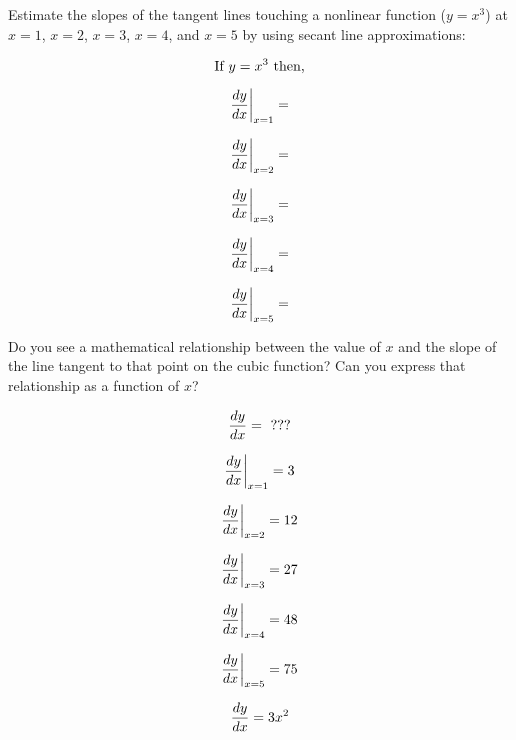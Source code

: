 

Estimate the slopes of the tangent lines touching a nonlinear function ($y = x^3$) at $x=1$, $x=2$, $x=3$, $x=4$, and $x=5$ by using secant line approximations:

\vskip 10pt

$$\hbox{If } y = x^3 \hbox{ then,}$$

\vskip 20pt

$${{dy \over dx} \bigg|} _ {x=1} = $$

\vskip 20pt

$${{dy \over dx} \bigg|} _ {x=2} = $$

\vskip 20pt

$${{dy \over dx} \bigg|} _ {x=3} = $$

\vskip 20pt

$${{dy \over dx} \bigg|} _ {x=4} = $$

\vskip 20pt

$${{dy \over dx} \bigg|} _ {x=5} = $$

\vskip 20pt

Do you see a mathematical relationship between the value of $x$ and the slope of the line tangent to that point on the cubic function?  Can you express that relationship as a function of $x$?

$${dy \over dx} = \hbox{ ???}$$







$${{dy \over dx} \bigg|} _ {x=1} = 3$$

\vskip 20pt

$${{dy \over dx} \bigg|} _ {x=2} = 12$$

\vskip 20pt

$${{dy \over dx} \bigg|} _ {x=3} = 27$$

\vskip 20pt

$${{dy \over dx} \bigg|} _ {x=4} = 48$$

\vskip 20pt

$${{dy \over dx} \bigg|} _ {x=5} = 75$$

\vskip 20pt

$${dy \over dx} = 3x^2$$












